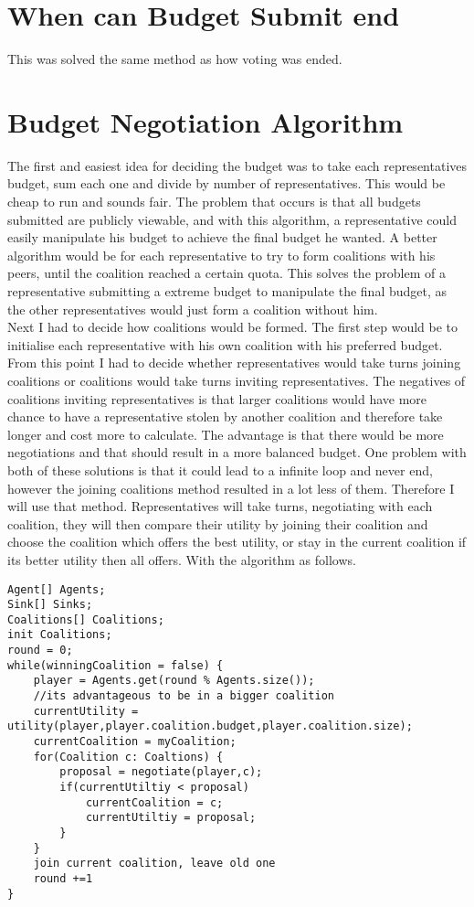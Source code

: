 \section{When can Budget Submit end}
This was solved the same method as how voting was ended.
\section{Budget Negotiation Algorithm}
The first and easiest idea for deciding the budget was to take each representatives budget, sum each one and divide by number of representatives. This would be cheap to run and sounds fair. The problem that occurs is that all budgets submitted are publicly viewable, and with this algorithm, a representative could easily manipulate his budget to achieve the final budget he wanted. 
A better algorithm would be for each representative to try to form coalitions with his peers, until the coalition reached a certain quota. This solves the problem of a representative submitting a extreme budget to manipulate the final budget, as the other representatives would just form a coalition without him.  
\\
Next I had to decide how coalitions would be formed. The first step would be to initialise each representative with his own coalition with his preferred budget. From this point I had to decide whether representatives would take turns joining coalitions or coalitions would take turns inviting representatives. The negatives of coalitions inviting representatives is that larger coalitions would have more chance to have a representative stolen by another coalition and therefore take longer and cost more to calculate. The advantage is that there would be more negotiations and that should result in a more balanced budget. One problem with both of these solutions is that it could lead to a infinite loop and never end, however the joining coalitions method resulted in a lot less of them. Therefore I will use that method. Representatives will take turns, negotiating with each coalition, they will then compare their utility by joining their coalition and choose the coalition which offers the best utility, or stay in the current coalition if its better utility then all offers. With the algorithm as follows.
\begin{lstlisting}
Agent[] Agents;
Sink[] Sinks;
Coalitions[] Coalitions;
init Coalitions;
round = 0;
while(winningCoalition = false) {
	player = Agents.get(round % Agents.size());
	//its advantageous to be in a bigger coalition
	currentUtility = utility(player,player.coalition.budget,player.coalition.size);
	currentCoalition = myCoalition;
	for(Coalition c: Coaltions) {
		proposal = negotiate(player,c);
		if(currentUtiltiy < proposal)
			currentCoalition = c;
			currentUtiltiy = proposal;
		}
	}
	join current coalition, leave old one
	round +=1
}
\end{lstlisting}
